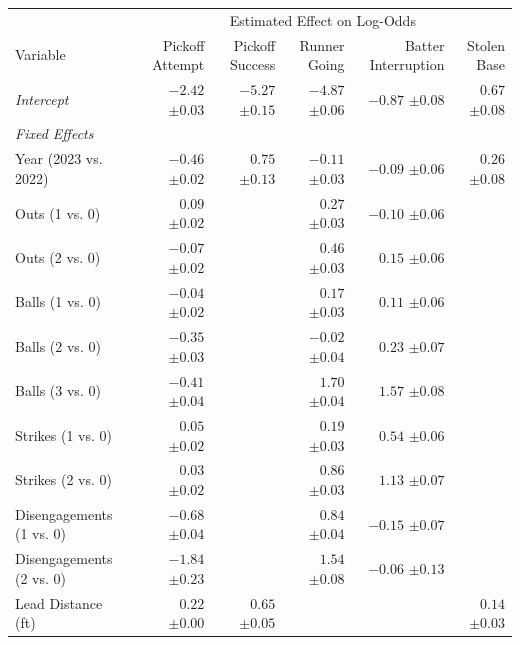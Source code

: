 \begin{tabular}{l|rrrrr}
&\multicolumn{5}{c}{Estimated Effect on Log-Odds}\\
Variable & Pickoff Attempt & Pickoff Success & Runner Going & Batter Interruption & Stolen Base \\
  \hline
{\it Intercept} & $-2.42$ {\color{gray} $\pm0.03$} & $-5.27$ {\color{gray} $\pm0.15$} & $-4.87$ {\color{gray} $\pm0.06$} & $-0.87$ {\color{gray} $\pm0.08$} & $0.67$ {\color{gray} $\pm0.08$} \\ 
   \hline
{\it Fixed Effects} &  &  &  &  &  \\ 
  Year (2023 vs. 2022) & $-0.46$ {\color{gray} $\pm0.02$} & $0.75$ {\color{gray} $\pm0.13$} & $-0.11$ {\color{gray} $\pm0.03$} & $-0.09$ {\color{gray} $\pm0.06$} & $0.26$ {\color{gray} $\pm0.08$} \\ 
  Outs (1 vs. 0) & $0.09$ {\color{gray} $\pm0.02$} &  & $0.27$ {\color{gray} $\pm0.03$} & $-0.10$ {\color{gray} $\pm0.06$} &  \\ 
  Outs (2 vs. 0) & $-0.07$ {\color{gray} $\pm0.02$} &  & $0.46$ {\color{gray} $\pm0.03$} & $0.15$ {\color{gray} $\pm0.06$} &  \\ 
  Balls (1 vs. 0) & $-0.04$ {\color{gray} $\pm0.02$} &  & $0.17$ {\color{gray} $\pm0.03$} & $0.11$ {\color{gray} $\pm0.06$} &  \\ 
  Balls (2 vs. 0) & $-0.35$ {\color{gray} $\pm0.03$} &  & $-0.02$ {\color{gray} $\pm0.04$} & $0.23$ {\color{gray} $\pm0.07$} &  \\ 
  Balls (3 vs. 0) & $-0.41$ {\color{gray} $\pm0.04$} &  & $1.70$ {\color{gray} $\pm0.04$} & $1.57$ {\color{gray} $\pm0.08$} &  \\ 
  Strikes (1 vs. 0) & $0.05$ {\color{gray} $\pm0.02$} &  & $0.19$ {\color{gray} $\pm0.03$} & $0.54$ {\color{gray} $\pm0.06$} &  \\ 
  Strikes (2 vs. 0) & $0.03$ {\color{gray} $\pm0.02$} &  & $0.86$ {\color{gray} $\pm0.03$} & $1.13$ {\color{gray} $\pm0.07$} &  \\ 
  Disengagements (1 vs. 0) & $-0.68$ {\color{gray} $\pm0.04$} &  & $0.84$ {\color{gray} $\pm0.04$} & $-0.15$ {\color{gray} $\pm0.07$} &  \\ 
  Disengagements (2 vs. 0) & $-1.84$ {\color{gray} $\pm0.23$} &  & $1.54$ {\color{gray} $\pm0.08$} & $-0.06$ {\color{gray} $\pm0.13$} &  \\ 
  Lead Distance (ft) & $0.22$ {\color{gray} $\pm0.00$} & $0.65$ {\color{gray} $\pm0.05$} &  &  & $0.14$ {\color{gray} $\pm0.03$} \\ 

\end{tabular}
